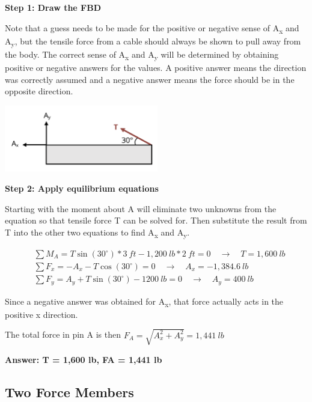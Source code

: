 \documentclass[
  letterpaper,
  DIV=11,
  numbers=noendperiod]{scrreprt}
\begin{document}
\begin{tcolorbox}
\begin{tcolorbox}
\textbf{Step 1: Draw the FBD}

Note that a guess needs to be made for the positive or negative sense of
A\textsubscript{x} and A\textsubscript{y}, but the tensile force from a
cable should always be shown to pull away from the body. The correct
sense of A\textsubscript{x} and A\textsubscript{y} will be determined by
obtaining positive or negative answers for the values. A positive answer
means the direction was correctly assumed and a negative answer means
the force should be in the opposite direction.

\begin{center}
\includegraphics[width=2.64583in,height=\textheight]{images/CH1 PNGs/example 1.1 part 2.png}
\end{center}

\textbf{Step 2: Apply equilibrium equations}

Starting with the moment about A will eliminate two unknowns from the
equation so that tensile force T can be solved for. Then substitute the
result from T into the other two equations to find A\textsubscript{x}
and A\textsubscript{y}.

\[
\begin{aligned}
& \sum M_A=T \sin (30^{\circ}) * 3{~ft}-1,200{~lb }*2{~ft}=0 \quad\rightarrow\quad T=1,600 {~lb} \\
& \sum F_x=-A_x-T \cos (30^{\circ})=0 \quad\rightarrow\quad A_x=-1,384.6{~lb} \\
& \sum F_y=A_y+T \sin (30^{\circ})-1200{~lb}=0 \quad\rightarrow\quad A_y= 400{~lb}
\end{aligned}
\]

Since a negative answer was obtained for A\textsubscript{x}, that force
actually acts in the positive x direction.

The total force in pin A is then \(F_A=\sqrt{A_x^2+A_y^2}=1,441{~lb}\)

\textbf{Answer: T = 1,600 lb, FA = 1,441 lb}

\end{tcolorbox}

\end{tcolorbox}

\subsection{Two Force Members}\label{two-force-members}
\end{document}
